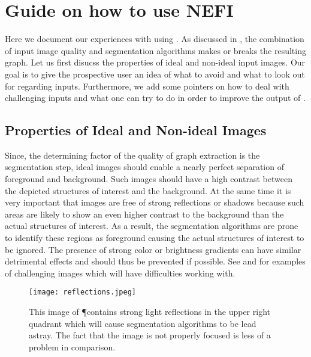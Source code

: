 
\chapter{Guide on how to use NEFI}\label{app:nefi}

	Here we document our experiences with using \NEFI. As discussed in , the combination of input image quality and \NEFIs segmentation algorithms makes or breaks the resulting graph. Let us first disucss the properties of ideal and non-ideal input images. Our goal is to give the prospective user an idea of what to avoid and what to look out for regarding inputs. Furthermore, we add some pointers on how to deal with challenging inputs and what one can try to do in order to improve the output of \NEFI. 

\section{Properties of Ideal and Non-ideal Images}

	Since, the determining factor of the quality of \NEFIs graph extraction is the segmentation step, ideal images should enable a nearly perfect separation of foreground and background. Such images should have a high contrast between the depicted structures of interest and the background. At the same time it is very important that images are free of strong reflections or shadows because such areas are likely to show an even higher contrast to the background than the actual structures of interest. As a result, the segmentation algorithms are prone to identify these regions as foreground causing the actual structures of interest to be ignored. The presence of strong color or brightness gradients can have similar detrimental effects and should thus be prevented if possible. See  and  for examples of challenging images which \NEFI will have difficulties working with.

	\begin{figure}
		\centering
		\texttt{[image: reflections.jpeg]}
		\caption[\NEFIs caveats: Reflections]{This image of \P contains strong light reflections in the upper right quadrant which will cause \NEFIs segmentation algorithms to be lead astray. The fact that the image is not properly focused is less of a problem in comparison.}
		\label{fig:sup:reflection}
	\end{figure}

